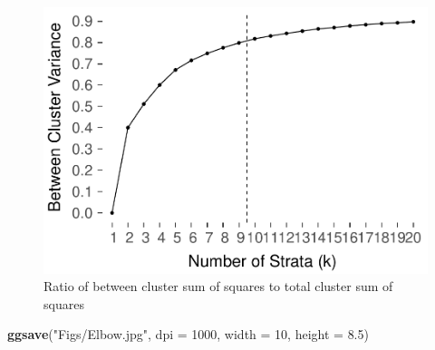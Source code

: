 \documentclass[man]{apa6}
\newenvironment{Shaded}{\begin{snugshade}}{\end{snugshade}}
\newcommand{\DataTypeTok}[1]{\textcolor[rgb]{0.13,0.29,0.53}{#1}}
\newcommand{\DecValTok}[1]{\textcolor[rgb]{0.00,0.00,0.81}{#1}}
\newcommand{\FloatTok}[1]{\textcolor[rgb]{0.00,0.00,0.81}{#1}}
\newcommand{\KeywordTok}[1]{\textcolor[rgb]{0.13,0.29,0.53}{\textbf{#1}}}
\newcommand{\NormalTok}[1]{#1}
\newcommand{\StringTok}[1]{\textcolor[rgb]{0.31,0.60,0.02}{#1}}
\begin{document}
\begin{figure}
\centering
\includegraphics{GenSamp_Paper_Code_files/figure-latex/fig-ratio-1.pdf}
\caption{\label{fig:fig-ratio}Ratio of between cluster sum of squares to total cluster sum of squares}
\end{figure}

\begin{Shaded}
\begin{Highlighting}[]
\KeywordTok{ggsave}\NormalTok{(}\StringTok{"Figs/Elbow.jpg"}\NormalTok{, }\DataTypeTok{dpi =} \DecValTok{1000}\NormalTok{, }\DataTypeTok{width =} \DecValTok{10}\NormalTok{, }\DataTypeTok{height =} \FloatTok{8.5}\NormalTok{)}
\end{Highlighting}
\end{Shaded}
\end{document}
